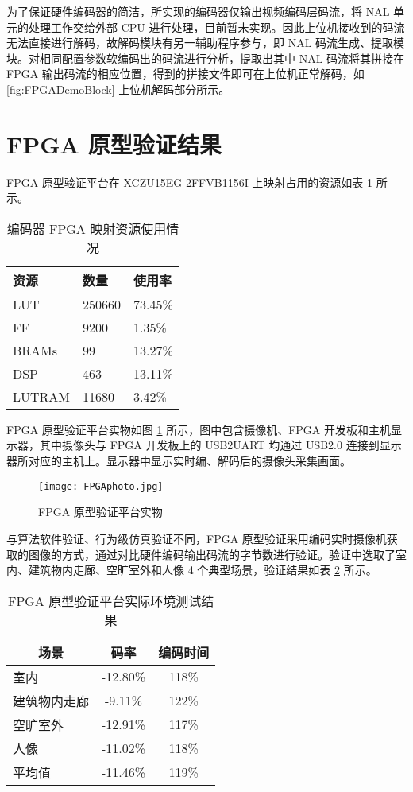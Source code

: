 为了保证硬件编码器的简洁，所实现的编码器仅输出视频编码层码流，将 NAL 单元的处理工作交给外部 CPU 进行处理，目前暂未实现。因此上位机接收到的码流无法直接进行解码，故解码模块有另一辅助程序参与，即 NAL 码流生成、提取模块。对相同配置参数软编码出的码流进行分析，提取出其中 NAL 码流将其拼接在 FPGA 输出码流的相应位置，得到的拼接文件即可在上位机正常解码，如 \ref{fig:FPGADemoBlock} 上位机解码部分所示。

\section{FPGA 原型验证结果}
FPGA 原型验证平台在 XCZU15EG-2FFVB1156I 上映射占用的资源如表 \ref{tab:FPGAResource} 所示。
\begin{table}[hbt]
\centering
\caption{编码器 FPGA 映射资源使用情况}
\label{tab:FPGAResource}
\begin{tabular}{@{}lll@{}}
\toprule
资源     & 数量     & 使用率     \\ \midrule
LUT    & 250660 & 73.45\% \\
FF     & 9200   & 1.35\%  \\
BRAMs  & 99     & 13.27\% \\
DSP    & 463    & 13.11\% \\
LUTRAM & 11680  & 3.42\%  \\ \bottomrule
\end{tabular}
\end{table}

FPGA 原型验证平台实物如图 \ref{fig:FPGAphoto} 所示，图中包含摄像机、FPGA 开发板和主机显示器，其中摄像头与 FPGA 开发板上的 USB2UART 均通过 USB2.0 连接到显示器所对应的主机上。显示器中显示实时编、解码后的摄像头采集画面。
\begin{figure}[hbt]
    \centering
    \texttt{[image: FPGAphoto.jpg]}
    \caption{FPGA 原型验证平台实物}
    \label{fig:FPGAphoto}
\end{figure}

与算法软件验证、行为级仿真验证不同，FPGA 原型验证采用编码实时摄像机获取的图像的方式，通过对比硬件编码输出码流的字节数进行验证。验证中选取了室内、建筑物内走廊、空旷室外和人像 4 个典型场景，验证结果如表 \ref{tab:FPGADemoTestTab} 所示。
\begin{table}[hbt]
    \centering
    \caption{FPGA 原型验证平台实际环境测试结果}
    \label{tab:FPGADemoTestTab}
    \begin{tabular}{@{}lcc@{}}
        \toprule
        \multicolumn{1}{c}{场景} & 码率     & 编码时间 \\ \midrule
        室内                     & -12.80\% & 118\%    \\
        建筑物内走廊             & -9.11\%  & 122\%    \\
        空旷室外                 & -12.91\% & 117\%    \\
        人像                     & -11.02\% & 118\%    \\ \midrule
        平均值                   & -11.46\% & 119\%    \\ \bottomrule
    \end{tabular}
\end{table}

